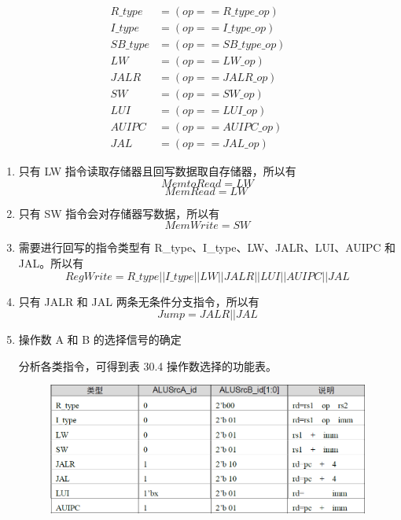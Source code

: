 \documentclass[12pt,hyperref,a4paper,UTF8]{ctexart}
\begin{document}
\begin{equation*}
\begin{aligned}
R\_type &= (op == R\_type\_op) \\
I\_type &= (op == I\_type\_op) \\
SB\_type &= (op == SB\_type\_op) \\
LW &= (op == LW\_op) \\
JALR &= (op == JALR\_op) \\
SW &= (op == SW\_op) \\
LUI &= (op == LUI\_op) \\
AUIPC &= (op == AUIPC\_op) \\
JAL &= (op == JAL\_op)
\end{aligned}
\end{equation*}

\begin{enumerate}
    \item 只有 LW 指令读取存储器且回写数据取自存储器，所以有
    \begin{equation}
    MemtoRead = LW 
    \end{equation}
    \begin{equation}
    MemRead = LW \
    \end{equation}
    \item 只有 SW 指令会对存储器写数据，所以有
    \begin{equation}
    MemWrite = SW 
    \end{equation}
    \item 需要进行回写的指令类型有 R\_type、I\_type、LW、JALR、LUI、AUIPC 和 JAL。所以有
    \begin{equation}
    RegWrite = R\_type || I\_type || LW || JALR || LUI || AUIPC || JAL 
    \end{equation}
    \item 只有 JALR 和 JAL 两条无条件分支指令，所以有
    \begin{equation}
    Jump = JALR || JAL 
    \end{equation}
    \item 操作数 A 和 B 的选择信号的确定

    分析各类指令，可得到表 30.4 操作数选择的功能表。

    \begin{figure}[H]
        \centering
        \includegraphics[width=1\textwidth]{figures/fig/image2.png}
    \end{figure}


\end{enumerate}
\end{document}
